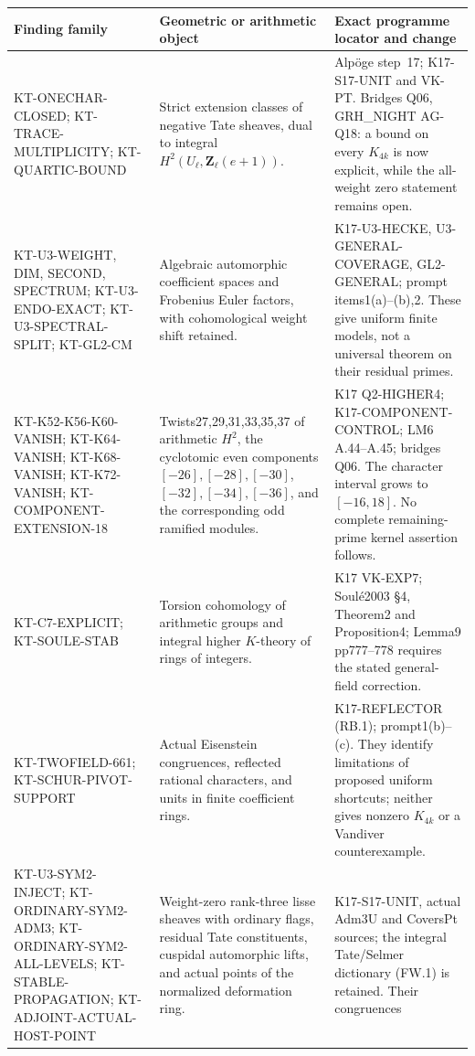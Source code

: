 \small
\begin{longtable}{>{\raggedright\arraybackslash}p{}
>{\raggedright\arraybackslash}p{}
>{\raggedright\arraybackslash}p{}}
\toprule
Finding family & Geometric or arithmetic object & Exact programme locator and change\\
\midrule\endhead
KT-ONECHAR-CLOSED; KT-TRACE-MULTIPLICITY; KT-QUARTIC-BOUND &
Strict extension classes of negative Tate sheaves, dual to
integral $H^2(U_\ell,\mathbf Z_\ell(e+1))$. &
Alp\"oge step~17; K17-S17-UNIT and VK-PT. Bridges Q06,
GRH\_NIGHT AG-Q18: a bound on every $K_{4k}$ is now explicit,
while the all-weight zero statement remains open.\\
KT-U3-WEIGHT, DIM, SECOND, SPECTRUM; KT-U3-ENDO-EXACT; KT-U3-SPECTRAL-SPLIT; KT-GL2-CM &
Algebraic automorphic coefficient spaces and Frobenius Euler
factors, with cohomological weight shift retained. &
K17-U3-HECKE, U3-GENERAL-COVERAGE, GL2-GENERAL; prompt
items1(a)--(b),2. These give uniform finite models, not a
universal theorem on their residual primes.\\
KT-K52-K56-K60-VANISH; KT-K64-VANISH; KT-K68-VANISH; KT-K72-VANISH;
KT-COMPONENT-EXTENSION-18 &
Twists27,29,31,33,35,37 of arithmetic $H^2$, the cyclotomic even components
$[-26],[-28],[-30]$, $[-32],[-34],[-36]$, and the corresponding odd ramified modules. &
K17 Q2-HIGHER4; K17-COMPONENT-CONTROL; LM6 A.44--A.45;
bridges Q06. The character interval grows to $[-16,18]$.
No complete remaining-prime kernel assertion follows.\\
KT-C7-EXPLICIT; KT-SOULE-STAB &
Torsion cohomology of arithmetic groups and integral higher
$K$-theory of rings of integers. &
K17 VK-EXP7; Soul\'e2003 \S4, Theorem2 and Proposition4;
Lemma9 pp777--778 requires the stated general-field correction.\\
KT-TWOFIELD-661; KT-SCHUR-PIVOT-SUPPORT &
Actual Eisenstein congruences, reflected rational characters,
and units in finite coefficient rings. &
K17-REFLECTOR (RB.1); prompt1(b)--(c). They identify
limitations of proposed uniform shortcuts; neither gives
nonzero $K_{4k}$ or a Vandiver counterexample.\\
KT-U3-SYM2-INJECT; KT-ORDINARY-SYM2-ADM3;
KT-ORDINARY-SYM2-ALL-LEVELS;
KT-STABLE-PROPAGATION; KT-ADJOINT-ACTUAL-HOST-POINT &
Weight-zero rank-three lisse sheaves with ordinary flags,
residual Tate constituents, cuspidal automorphic lifts, and
actual points of the normalized deformation ring. &
K17-S17-UNIT, actual Adm3U and CoversPt sources; the integral
Tate/Selmer dictionary (FW.1) is retained. Their congruences

\end{longtable}

